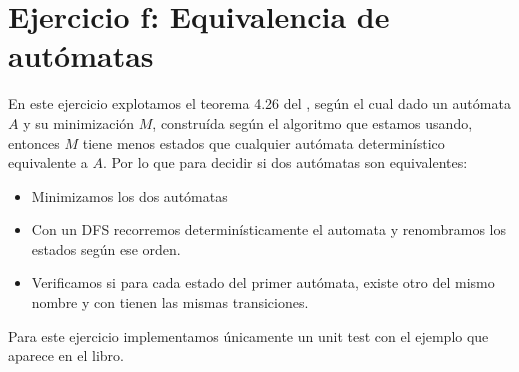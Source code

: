 \documentclass{article}
\begin{document}
\section*{Ejercicio f: Equivalencia de autómatas}

En este ejercicio explotamos el teorema 4.26 del \Hopcroft,  según el cual dado un autómata $A$ y su minimización $M$, construída según el algoritmo que estamos usando, entonces $M$ tiene menos estados que cualquier autómata determinístico equivalente a $A$.  Por lo que para decidir si dos autómatas son equivalentes:

\begin{itemize}
\item Minimizamos los dos autómatas
\item Con un DFS recorremos determinísticamente el automata y renombramos los estados según ese orden.
\item Verificamos si para cada estado del primer autómata, existe otro del mismo nombre y con tienen las mismas transiciones.
\end{itemize}

Para este ejercicio implementamos únicamente un unit test con el ejemplo que aparece en el libro.




\end{document}
